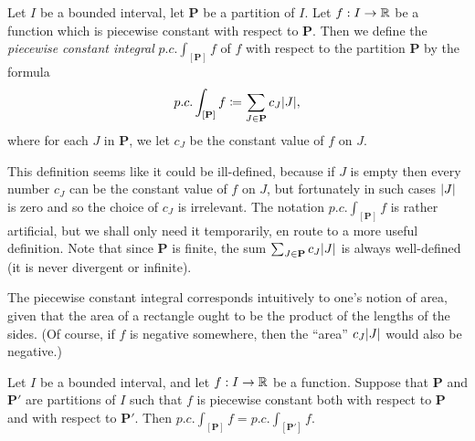\begin{defn}\label{i:11.2.9}
  Let \(I\) be a bounded interval, let \(\mathbf{P}\) be a partition of \(I\).
  Let \(f : I \to \mathbb{R}\) be a function which is piecewise constant with respect to \(\mathbf{P}\).
  Then we define the \emph{piecewise constant integral} \(p.c. \int_{[\mathbf{P}]} f\) of \(f\) with respect to the partition \(\mathbf{P}\) by the formula
  \[
    p.c. \int_{[\mathbf{P}]} f \coloneqq \sum_{J \in \mathbf{P}} c_J \abs{J},
  \]
  where for each \(J\) in \(\mathbf{P}\), we let \(c_J\) be the constant value of \(f\) on \(J\).
\end{defn}

\begin{rmk}\label{i:11.2.10}
  This definition seems like it could be ill-defined, because if \(J\) is empty then every number \(c_J\) can be the constant value of \(f\) on \(J\), but fortunately in such cases \(\left\lvert J\right\rvert\) is zero and so the choice of \(c_J\) is irrelevant.
  The notation \(p.c. \int_{[\mathbf{P}]} f\) is rather artificial, but we shall only need it temporarily, en route to a more useful definition.
  Note that since \(\mathbf{P}\) is finite, the sum \(\sum_{J \in \mathbf{P}} c_J \abs{J}\) is always well-defined
  (it is never divergent or infinite).
\end{rmk}

\begin{rmk}\label{i:11.2.11}
  The piecewise constant integral corresponds intuitively to one's notion of area, given that the area of a rectangle ought to be the product of the lengths of the sides.
  (Of course, if \(f\) is negative somewhere, then the ``area'' \(c_J \abs{J}\) would also be negative.)
\end{rmk}

\setcounter{thm}{12}
\begin{prop}\label{i:11.2.13}
  Let \(I\) be a bounded interval, and let \(f : I \to \mathbb{R}\) be a function.
  Suppose that \(\mathbf{P}\) and \(\mathbf{P}'\) are partitions of \(I\) such that \(f\) is piecewise constant both with respect to \(\mathbf{P}\) and with respect to \(\mathbf{P}'\).
  Then \(p.c. \int_{[\mathbf{P}]} f = p.c. \int_{[\mathbf{P}']} f\).
\end{prop}

